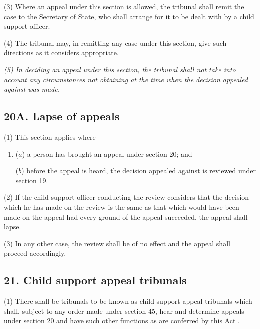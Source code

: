 \documentclass[12pt,a4paper]{article}
\begin{document}
(3) Where an appeal under this section is allowed, the tribunal shall remit the case to the Secretary of State, who shall arrange for it to be dealt with by a child support officer.

(4) The tribunal may, in remitting any case under this section, give such directions as it considers appropriate.

\emph{(5) In deciding an appeal under this section, the tribunal shall not take into account any circumstances not obtaining at the time when the decision appealed against was made.}


\subsection{20A. Lapse of appeals}

(1) This section applies where—
\begin{enumerate}\item[]
($a$) a person has brought an appeal under section 20; and

($b$) before the appeal is heard, the decision appealed against is reviewed under section 19.
\end{enumerate}

(2) If the child support officer conducting the review considers that the decision which he has made on the review is the same as that which would have been made on the appeal had every ground of the appeal succeeded, the appeal shall lapse.

(3) In any other case, the review shall be of no effect and the appeal shall proceed accordingly.


\subsection{21. Child support appeal tribunals}

(1) There shall be tribunals to be known as child support appeal tribunals which shall, subject to any order made under section 45, hear and determine appeals under section 20
and have such other functions as are conferred by this Act%
.
\end{document}
